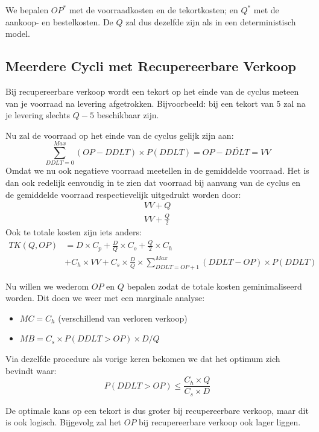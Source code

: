 We bepalen $OP^*$ met de voorraadkosten en de tekortkosten; en $Q^*$ met de aankoop- en bestelkosten. De $Q$ zal dus dezelfde zijn als in een deterministisch model.

\subsection{Meerdere Cycli met Recupereerbare Verkoop}
\label{sub:Meerdere Cycli met Recupereerbare Verkoop}
Bij recupereerbare verkoop wordt een tekort op het einde van de cyclus meteen van je voorraad na levering afgetrokken. Bijvoorbeeld: bij een tekort van 5 zal na je levering slechts $Q - 5$ beschikbaar zijn.

Nu zal de voorraad op het einde van de cyclus gelijk zijn aan:
\begin{equation}
    \sum_{DDLT = 0}^{Max} (OP - DDLT) \times P(DDLT) = OP - \overline{DDLT} = VV
\end{equation}
Omdat we nu ook negatieve voorraad meetellen in de gemiddelde voorraad. Het is dan ook redelijk eenvoudig in te zien dat voorraad bij aanvang van de cyclus en de gemiddelde voorraad respectievelijk uitgedrukt worden door:
\begin{align*}
    VV + Q \\
    VV + \frac{Q}{2}
\end{align*}
Ook te totale kosten zijn iets anders:
\begin{align*}
    TK(Q,OP) &= D \times C_p + \frac{D}{Q} \times C_o + \frac{Q}{2} \times C_h \\
    &+ C_h \times VV + C_s \times \frac{D}{Q} \times \sum_{DDLT=OP+1}^{Max} (DDLT-OP) \times P(DDLT)
\end{align*}

Nu willen we wederom $OP$ en $Q$ bepalen zodat de totale kosten geminimaliseerd worden. Dit doen we weer met een marginale analyse:
\begin{itemize}
    \item $MC = C_h$ (verschillend van verloren verkoop)
    \item $MB = C_s \times P(DDLT > OP) \times D/Q$
\end{itemize}

Via dezelfde procedure als vorige keren bekomen we dat het optimum zich bevindt waar:
\begin{equation}
    P(DDLT> OP) \le \frac{C_h \times Q}{C_s \times D}
\end{equation}

De optimale kans op een tekort is dus groter bij recupereerbare verkoop, maar dit is ook logisch. Bijgevolg zal het $OP$ bij recupereerbare verkoop ook lager liggen.


